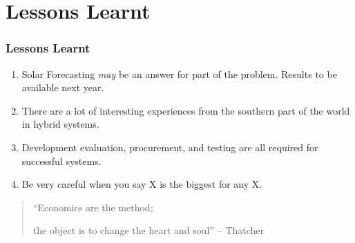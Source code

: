 \documentclass{beamer}
\begin{document}
\section{Lessons Learnt}
\begin{frame}\frametitle{Lessons Learnt}

\begin{enumerate}
\item Solar Forecasting \emph{may} be an answer for part of the
  problem. Results to be available next year.
\pause
\item There are a lot of interesting experiences from the 
  southern part of the world in hybrid systems.
\pause
\item Development evaluation, procurement, and testing 
  are all required for successful systems.
\pause  
\item Be very careful when you say X is the biggest for any X.
\end{enumerate}
\pause
\vfill
\begin{quote}
``Economics are the method; 

\pause
the object is to change the heart and soul'' -- Thatcher
\end{quote}
\end{frame}
\end{document}
